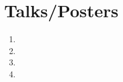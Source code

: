 \documentclass[a4paper,10pt]{article}
\begin{document}
%


\section{Talks/Posters}
\begin{enumerate}
\item {}
\item {}
\item {}
\item {}
\end{enumerate}

\end{document}

